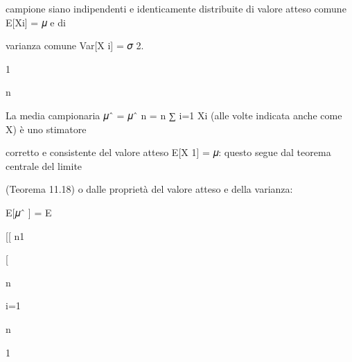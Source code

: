 \documentclass[a4paper,portrait,12pt]{article}
\begin{document}
\begin{flushleft}
campione siano indipendenti e identicamente distribuite di valore atteso comune E[Xi] = 𝜇 e di
\end{flushleft}


\begin{flushleft}
varianza comune Var[X i] = 𝜎 2.
\end{flushleft}


1


\begin{flushleft}
n
\end{flushleft}


\begin{flushleft}
La media campionaria 𝜇ˆ = 𝜇ˆ n = n ∑ i=1 Xi (alle volte indicata anche come X) \`{e} uno stimatore
\end{flushleft}


\begin{flushleft}
corretto e consistente del valore atteso E[X 1] = 𝜇: questo segue dal teorema centrale del limite
\end{flushleft}


\begin{flushleft}
(Teorema 11.18) o dalle propriet\`{a} del valore atteso e della varianza:
\end{flushleft}


\begin{flushleft}
E[𝜇ˆ ] = E
\end{flushleft}





\begin{flushleft}
[[ n1
\end{flushleft}


[





\begin{flushleft}
n
\end{flushleft}





\begin{flushleft}
i=1
\end{flushleft}


\begin{flushleft}
n
\end{flushleft}





1
\end{document}
